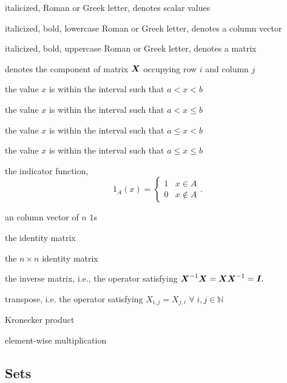 \begin{description}[leftmargin=!, labelwidth=0.7in]
  \item[$x$]             italicized, Roman or Greek letter, denotes scalar values
  \item[$\bs{x}$]        italicized, bold, lowercase Roman or Greek letter, denotes a column vector
  \item[$\bs{X}$]        italicized, bold, uppercase Roman or Greek letter, denotes a matrix
	\item[$\bs{X}_{ij}$] 	 denotes the component of matrix $\bs{X}$ occupying row $i$ and column $j$

  \item[$x \in (a, b)$]  the value $x$ is within the interval such that $a < x < b$
  \item[{$x \in (a, b]$}]  the value $x$ is within the interval such that $a < x \leq b$
  \item[$x \in [a, b)$]  the value $x$ is within the interval such that $a \leq x < b$
  \item[{$x \in [a, b]$}]  the value $x$ is within the interval such that $a \leq x \leq b$
  \item[$1_{A}\left(x\right)$] the indicator function,\[1_{A}\left(x \right) = \begin{cases} 1 & x \in A \\ 0 & x \notin A \end{cases}.\]
  \item[$\bs{1}_n$] an column vector of $n$ $1$s
  \item[$\bs{I}$] the identity matrix
  \item[$\bs{I}_n$] the $n \times n$ identity matrix
  \item[$\bs{X}^{-1}$] the inverse matrix, i.e., the operator satisfying $\boldsymbol{X}^{-1} \boldsymbol{X} = \boldsymbol{X} \boldsymbol{X}^{-1} = \boldsymbol{I}.$
  \item[$\bs{X}^{\top{T}}$] transpose, i.e. the operator satisfying $X_{i,j} = X_{j, i} \; \forall \; i,j \in \mathbb{N}$
  \item[$\otimes$] Kronecker product
  \item[$\odot$] element-wise multiplication
\end{description}

\subsection{Sets}

